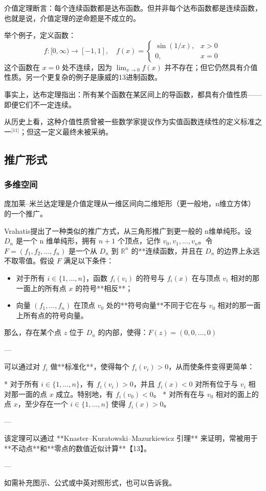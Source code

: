 介值定理断言：每个连续函数都是达布函数。但并非每个达布函数都是连续函数，也就是说，介值定理的逆命题是不成立的。

举个例子，定义函数：
$$
f : [0, \infty) \to [-1, 1], \quad f(x) = \begin{cases}
\sin(1/x), & x > 0 \\
0, & x = 0
\end{cases}~
$$
这个函数在 $x = 0$ 处不连续，因为 $\lim_{x \to 0} f(x)$ 并不存在；但它仍然具有介值性质。另一个更复杂的例子是康威的13进制函数。

事实上，达布定理指出：所有某个函数在某区间上的导函数，都具有介值性质——即便它们不一定连续。

从历史上看，这种介值性质曾被一些数学家提议作为实值函数连续性的定义标准之一\(^\text{[11]}\)；但这一定义最终未被采纳。
\subsection{推广形式}
\subsubsection{多维空间}
庞加莱–米兰达定理是介值定理从一维区间向二维矩形（更一般地，n维立方体）的一个推广。

Vrahatis提出了一种类似的推广方式，从三角形推广到更一般的 n维单纯形。设 $D_n$ 是一个 n 维单纯形，拥有 $n+1$ 个顶点，记作 $v_0, v_1, \dots, v_n$。令 $F = (f_1, f_2, \dots, f_n)$ 是一个从 $D_n$ 到 $\mathbb{R}^n$ 的**连续函数，并且在 $D_n$ 的边界上永远不取零值。假设 $F$ 满足以下条件：
\begin{itemize}
\item 对于所有 $i \in \{1, \dots, n\}$，函数 $f_i(v_i)$ 的符号与 $f_i(x)$ 在与顶点 $v_i$ 相对的那一面上的所有点 $x$ 的符号**相反**；
\item 向量 $(f_1, \dots, f_n)$ 在顶点 $v_0$ 处的**符号向量**不同于它在与 $v_0$ 相对的那一面上所有点的符号向量。
\end{itemize}
那么，存在某个点 $z$ 位于 $D_n$ 的内部，使得：$F(z) = (0, 0, \dots, 0)$

---

可以通过对 $f_i$ 做**标准化**，使得每个 $f_i(v_i) > 0$，从而使条件变得更简单：

* 对于所有 $i \in \{1, \dots, n\}$，有 $f_i(v_i) > 0$，并且 $f_i(x) < 0$ 对所有位于与 $v_i$ 相对那一面的点 $x$ 成立。特别地，有 $f_i(v_0) < 0$。
* 对所有在与 $v_0$ 相对的面上的点 $x$，至少存在一个 $i \in \{1, \dots, n\}$ 使得 $f_i(x) > 0$。

---

该定理可以通过 **Knaster–Kuratowski–Mazurkiewicz 引理** 来证明，常被用于**不动点**和**零点的数值近似计算**【13】。

---

如需补充图示、公式或中英对照形式，也可以告诉我。
